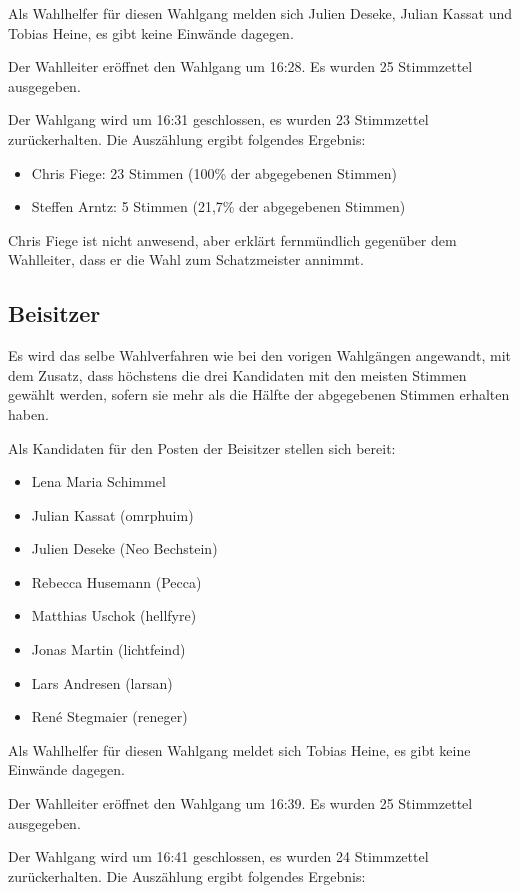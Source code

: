 \documentclass[a4paper,12pt]{scrartcl}
\begin{document}
Als Wahlhelfer für diesen Wahlgang melden sich Julien Deseke, Julian Kassat und
Tobias Heine, es gibt keine Einwände dagegen.

Der Wahlleiter eröffnet den Wahlgang um 16:28. Es wurden 25 Stimmzettel
ausgegeben.

Der Wahlgang wird um 16:31 geschlossen, es wurden 23 Stimmzettel zurückerhalten.
Die Auszählung ergibt folgendes Ergebnis:

\begin{itemize}
  \item Chris Fiege: 23 Stimmen (100\% der abgegebenen Stimmen)
  \item Steffen Arntz: 5 Stimmen (21{,}7\% der abgegebenen Stimmen)
\end{itemize}

Chris Fiege ist nicht anwesend, aber erklärt fernmündlich gegenüber dem
Wahlleiter, dass er die Wahl zum Schatzmeister annimmt.

\subsection{Beisitzer}
Es wird das selbe Wahlverfahren wie bei den vorigen Wahlgängen angewandt, mit
dem Zusatz, dass höchstens die drei Kandidaten mit den meisten Stimmen gewählt
werden, sofern sie mehr als die Hälfte der abgegebenen Stimmen erhalten haben.

Als Kandidaten für den Posten der Beisitzer stellen sich bereit:
\begin{itemize}
  \item Lena Maria Schimmel
  \item Julian Kassat (omrphuim)
  \item Julien Deseke (Neo Bechstein)
  \item Rebecca Husemann (Pecca)
  \item Matthias Uschok (hellfyre)
  \item Jonas Martin (lichtfeind)
  \item Lars Andresen (larsan)
  \item René Stegmaier (reneger)
\end{itemize}

Als Wahlhelfer für diesen Wahlgang meldet sich Tobias Heine, es gibt keine
Einwände dagegen.

Der Wahlleiter eröffnet den Wahlgang um 16:39. Es wurden 25 Stimmzettel
ausgegeben.

Der Wahlgang wird um 16:41 geschlossen, es wurden 24 Stimmzettel zurückerhalten.
Die Auszählung ergibt folgendes Ergebnis:
\end{document}

